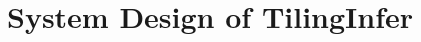 \documentclass[manuscript,screen,review]{acmart}
\theoremstyle{indenteditalic}
\providecommand{\DIFaddtex}[1]{{\protect\color{blue}#1}} %
\providecommand{\DIFidentity}[1]{#1}
\providecommand{\DIFdeltex}[1]{{%
  \protect\color{red}%
  \normalfont\normalsize
  \let\textbf\DIFidentity
  \let\textit\DIFidentity
  \let\texttt\DIFidentity
  \let\textsc\DIFidentity
  \let\textsf\DIFidentity
  \let\emph\DIFidentity
  \let\uline\DIFidentity
  \sout{#1}%
}} %
\providecommand{\DIFaddbegin}{} %
\providecommand{\DIFaddend}{} %
\providecommand{\DIFdelbegin}{} %
\providecommand{\DIFdelend}{} %
\providecommand{\DIFadd}[1]{\texorpdfstring{\DIFaddtex{#1}}{#1}} %
\providecommand{\DIFdel}[1]{\texorpdfstring{\DIFdeltex{#1}}{}} %
\begin{document}

\DIFaddend \section{System Design of TilingInfer}
\label{sec:design}
\end{document}
